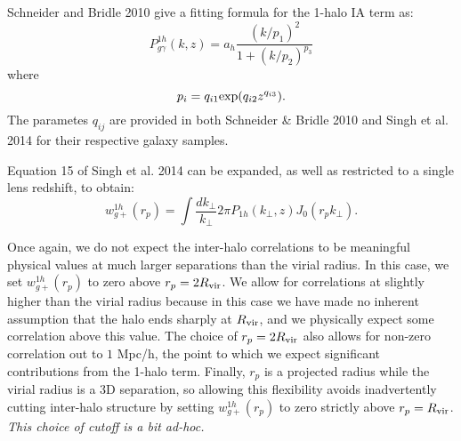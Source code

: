 \documentclass[onecolumn,amsmath,aps,fleqn, superscriptaddress]{revtex4}
\begin{document}
Schneider and Bridle 2010 give a fitting formula for the 1-halo IA term as:
\begin{equation}
P^{1h}_{g\gamma}(k,z) = a_h \frac{(k/p_1)^2}{1+ (k/p_2)^{p_3}}
\label{P1hIA}
\end{equation}
where
\begin{equation}
p_i = q_{i1} {\rm exp}(q_{i2} z^{q_{i3}}).
\label{pi}
\end{equation}
The parametes $q_{ij}$ are provided in both Schneider \& Bridle 2010 and Singh et al. 2014 for their respective galaxy samples. 

Equation 15 of Singh et al. 2014 can be expanded, as well as restricted to a single lens redshift, to obtain:
\begin{equation}
w_{g+}^{1h}(r_p) = \int \frac{dk_\perp}{k_\perp}{2\pi} P_{1h}(k_\perp,z) J_0(r_p k_\perp).
\label{wg1h}
\end{equation}

Once again, we do not expect the inter-halo correlations to be meaningful physical values at much larger separations than the virial radius. In this case, we set $w_{g+}^{1h}(r_p)$ to zero above $r_p = 2 R_{\rm vir}$. We allow for correlations at slightly higher than the virial radius because in this case we have made no inherent assumption that the halo ends sharply at $R_{\rm vir}$, and we physically expect some correlation above this value. The choice of $r_p = 2 R_{\rm vir}$ also allows for non-zero correlation out to $1$ Mpc/h, the point to which we expect significant contributions from the 1-halo term. Finally, $r_p$ is a projected radius while the virial radius is a 3D separation, so allowing this flexibility avoids inadvertently cutting inter-halo structure by setting $w_{g+}^{1h}(r_p)$ to zero strictly above $r_p = R_{\rm vir}$. {\it This choice of cutoff is a bit ad-hoc.}
\end{document}
